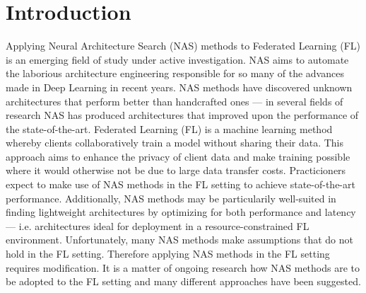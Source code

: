 \chapter{Introduction}\label{chapter:introduction}




Applying Neural Architecture Search (NAS) methods to Federated Learning (FL) is an emerging field of study under active investigation. 
NAS aims to automate the laborious architecture engineering responsible for so many of the advances made in Deep Learning in recent years. NAS methods have discovered unknown architectures that perform better than handcrafted ones — in several fields of research NAS has produced architectures that improved upon the performance of the state-of-the-art.
Federated Learning (FL) is a machine learning method whereby clients collaboratively train a model without sharing their data. This approach aims to enhance the privacy of client data and make training possible where it would otherwise not be due to large data transfer costs.
Practicioners expect to make use of NAS methods in the FL setting to achieve state-of-the-art performance. Additionally, NAS methods may be particularily well-suited in finding lightweight architectures by optimizing for both performance and latency — i.e. architectures ideal for deployment in a resource-constrained FL environment.
Unfortunately, many NAS methods make assumptions that do not hold in the FL setting. Therefore applying NAS methods in the FL setting requires modification. It is a matter of ongoing research how NAS methods are to be adopted to the FL setting and many different approaches have been suggested. 


